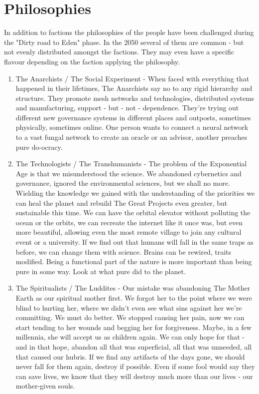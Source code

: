 \chapter{Philosophies}

In addition to factions the philosophies of the people have been challenged during the "Dirty road to Eden" phase. In the 2050 several of them are common - but not evenly distributed amongst the factions. They may even have a specific flavour depending on the faction applying the philosophy.

\begin{enumerate}
\item The Anarchists / The Social Experiment - When faced with everything that happened in their lifetimes, The Anarchists say no to any rigid hierarchy and structure. They promote mesh networks and technologies, distributed systems and manufacturing, support - but - not - dependence. They're trying out different new governance systems in different places and outposts, sometimes physically, sometimes online. One person wants to connect a neural network to a vast fungal network to create an oracle or an advisor, another preaches pure do-ocracy.

\item The Technologists / The Transhumanists - The problem of the Exponential Age is that we misunderstood the science. We abandoned cybernetics and governance, ignored the environmental sciences, but we shall no more. Wielding the knowledge we gained with the understanding of the priorities we can heal the planet and rebuild The Great Projects even greater, but sustainable this time. We can have the orbital elevator without polluting the ocean or the orbits, we can recreate the internet like it once was, but even more beautiful, allowing even the most remote village to join any cultural event or a university. If we find out that humans will fall in the same traps as before, we can change them with science. Brains can be rewired, traits modified. Being a functional part of the nature is more important than being pure in some way. Look at what pure did to the planet.

\item The Spiritualists / The Luddites - Our mistake was abandoning The Mother Earth as our spiritual mother first. We forgot her to the point where we were blind to hurting her, where we didn't even see what sins against her we're committing. We must do better. We stopped causing her pain, now we can start tending to her wounds and begging her for forgiveness. Maybe, in a few millennia, she will accept us as children again. We can only hope for that - and in that hope, abandon all that was superficial, all that was unneeded, all that caused our hubris. If we find any artifacts of the days gone, we should never fall for them again, destroy if possible. Even if some fool would say they can save lives, we know that they will destroy much more than our lives - our mother-given souls.


\end{enumerate}
